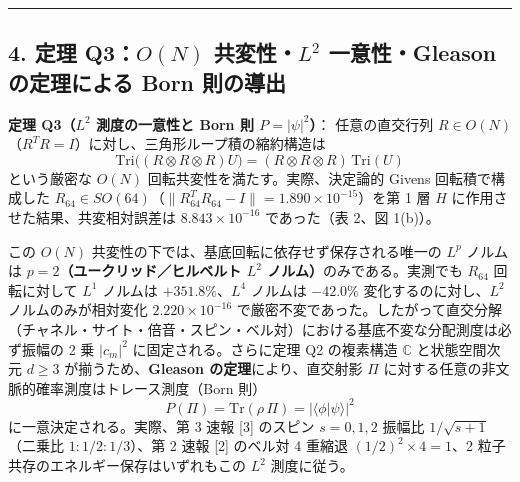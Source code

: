 \documentclass[
  a4paper,
]{ltjsarticle}
\begin{document}
\begin{center}\rule{0.5\linewidth}{0.5pt}\end{center}

\subsection{\texorpdfstring{4. 定理 Q3：\(O(N)\) 共変性・\(L^2\)
一意性・Gleason の定理による Born
則の導出}{4. 定理 Q3：O(N) 共変性・L\^{}2 一意性・Gleason の定理による Born 則の導出}}\label{ux5b9aux7406-q3on-ux5171ux5909ux6027l2-ux4e00ux610fux6027gleason-ux306eux5b9aux7406ux306bux3088ux308b-born-ux5247ux306eux5c0eux51fa}

\textbf{定理 Q3（\(L^2\) 測度の一意性と Born 則 \(P = |\psi|^2\)）}：
任意の直交行列
\(R \in O(N)\)（\(R^T R = I\)）に対し、三角形ループ積の縮約構造は
\[\mathrm{Tri}\bigl((R \otimes R \otimes R) U\bigr) = (R \otimes R \otimes R)\,\mathrm{Tri}(U)\]
という厳密な \(O(N)\) 回転共変性を満たす。実際、決定論的 Givens
回転積で構成した
\(R_{64} \in SO(64)\)（\(\|R_{64}^T R_{64} - I\| = 1.890 \times 10^{-15}\)）を第
1 層 \(H\) に作用させた結果、共変相対誤差は
\textbf{\(8.843 \times 10^{-16}\)} であった（表 2、図 1(b)）。

この \(O(N)\) 共変性の下では、基底回転に依存せず保存される唯一の \(L^p\)
ノルムは \textbf{\(p = 2\)（ユークリッド／ヒルベルト \(L^2\)
ノルム）}のみである。実測でも \(R_{64}\) 回転に対して \(L^1\) ノルムは
\(+351.8\%\)、\(L^4\) ノルムは \(-42.0\%\) 変化するのに対し、\(L^2\)
ノルムのみが相対変化 \textbf{\(2.220 \times 10^{-16}\)}
で厳密不変であった。したがって直交分解（チャネル・サイト・倍音・スピン・ベル対）における基底不変な分配測度は必ず振幅の
2 乗 \(|c_m|^2\) に固定される。さらに定理 Q2 の複素構造 \(\mathbb{C}\)
と状態空間次元 \(d \ge 3\) が揃うため、\textbf{Gleason
の定理}により、直交射影 \(\Pi\)
に対する任意の非文脈的確率測度はトレース測度（Born 則）
\[P(\Pi) = \mathrm{Tr}(\rho\,\Pi) = |\langle \phi | \psi \rangle|^2\]
に一意決定される。実際、第 3 速報 {[}3{]} のスピン \(s=0,1,2\) 振幅比
\(1/\sqrt{s+1}\)（二乗比 \(1 : 1/2 : 1/3\)）、第 2 速報 {[}2{]} のベル対
4 重縮退 \((1/2)^2 \times 4 = 1\)、2
粒子共存のエネルギー保存はいずれもこの \(L^2\) 測度に従う。
\end{document}
